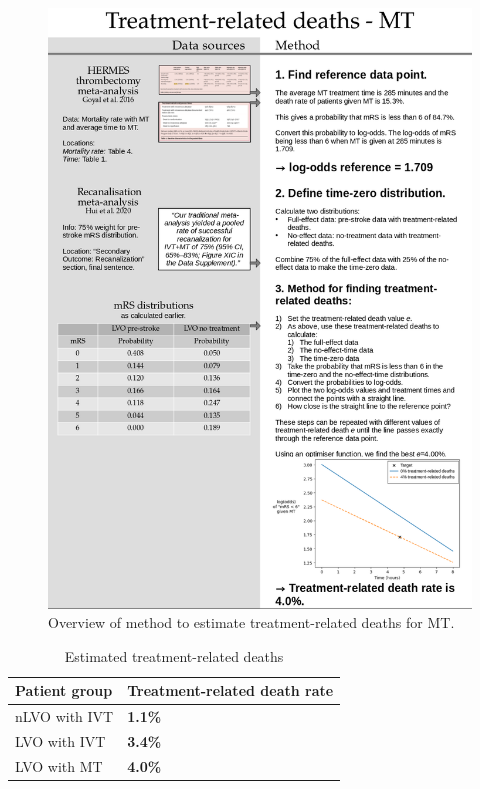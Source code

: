 \begin{figure}[h!]
    \centering
    \includegraphics[width=1.0\linewidth]{images_modelling/data_sources_excess-death-mt.png}
    \caption{Overview of method to estimate treatment-related deaths for MT.}
    \label{fig:mt_deaths}
\end{figure}


\begin{table}[h!]
    \centering
    \caption{Estimated treatment-related deaths}
    \begin{tabular}{l l}
    Patient group & Treatment-related death rate\\
    \hline
    nLVO with IVT & \textbf{1.1\%}\\
    LVO with IVT & \textbf{3.4\%}\\
    LVO with MT & \textbf{4.0\%}\\
    \end{tabular}
    \label{tab:treatment_deaths}
\end{table}

